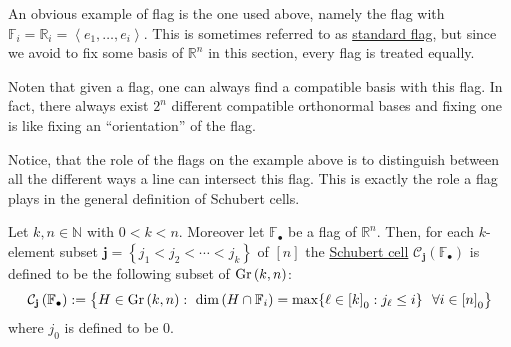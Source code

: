 An obvious example of flag is the one used above, namely the flag with $\mathbb{F}_i=\mathbb{R}_i=\left<e_1,\ldots,e_i\right>$. This is sometimes referred to as \ul{standard flag}, but since we avoid to fix some basis of $\mathbb{R}^n$ in this section, every flag is treated equally.

Noten that given a flag, one can always find a compatible basis with this flag. In fact, there always exist $2^n$ different compatible orthonormal bases and fixing one is like fixing an ``orientation'' of the flag.

Notice, that the role of the flags on the example above is to distinguish between all the different ways a line can intersect this flag. This is exactly the role a flag plays in the general definition of Schubert cells.

\begin{definition} Let $k,n\in\mathbb{N}$ with $0<k<n$. Moreover let $\mathbb{F}_{\bullet}$ be a flag of $\mathbb{R}^n$. Then, for each $k$-element subset $\mathbf{j}=\left\{j_1<j_2<\cdots<j_k\right\}$ of $[n]$ the \ul{Schubert cell} $\mathcal{C}_{\mathbf{j}}\left(\mathbb{F}_{\bullet}\right)$ is defined to be the following subset of $\Gr{k}{n}$:
\[\mathcal{C}_{\mathbf{j}}\left(\mathbb{F}_{\bullet}\right):=\big\{H\in\Gr{k}{n}:\ \dim\left(H\cap\mathbb{F}_i\right)=\max\{\ell\in{[k]}_0:j_{\ell}\leq i\}\ \ \forall i\in{[n]}_0\big\}\]
where $j_0$ is defined to be $0$.
\end{definition}

